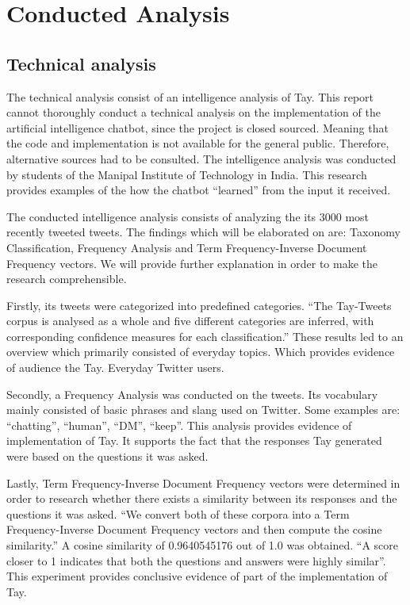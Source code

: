 \chapter{Conducted Analysis}

\section{Technical analysis}
The technical analysis consist of an intelligence analysis of Tay. This report cannot thoroughly conduct a technical analysis on the implementation of the artificial intelligence chatbot, since the project is closed sourced. Meaning that the code and implementation is not available for the general public. Therefore, alternative sources had to be consulted. The intelligence analysis was conducted by students of the Manipal Institute of Technology in India. This research provides examples of the how the chatbot “learned” from the input it received.

The conducted intelligence analysis consists of analyzing the its 3000 most recently tweeted tweets. The findings which will be elaborated on are: Taxonomy Classification, Frequency Analysis and Term Frequency-Inverse Document Frequency vectors. We will provide further explanation in order to make the research comprehensible.

Firstly, its tweets were categorized into predefined categories. “The Tay-Tweets corpus is analysed as a whole and five different categories are inferred, with corresponding confidence measures for each classification.” These results led to an overview which primarily consisted of everyday topics. Which provides evidence of audience the Tay. Everyday Twitter users.

Secondly, a Frequency Analysis was conducted on the tweets. Its vocabulary mainly consisted of basic phrases and slang used on Twitter. Some examples are: “chatting”, “human”, “DM”, “keep”. This analysis provides evidence of implementation of Tay. It supports the fact that the responses Tay generated were based on the questions it was asked.

Lastly, Term Frequency-Inverse Document Frequency vectors were determined in order to research whether there exists a similarity between its responses and the questions it was asked. “We convert both of these corpora into a Term Frequency-Inverse Document Frequency vectors and then compute the cosine similarity.” A cosine similarity of 0.9640545176 out of 1.0 was obtained. “A score closer to 1 indicates that both the questions and answers were highly similar”. This experiment provides conclusive evidence of part of the implementation of Tay.

